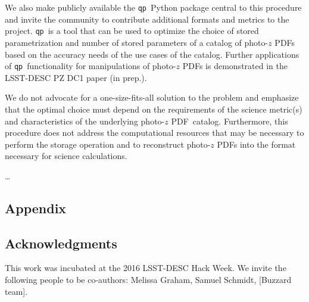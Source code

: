 \documentclass[\docopts]{\docclass}
\newcommand{\qp}{\texttt{qp}}
\newcommand{\pz}{photo-$z$ PDF}
\begin{document}
We also make publicly available the \qp\ Python package central to this 
procedure and invite the community to contribute additional formats and metrics 
to the project.  \qp\ is a tool that can be used to optimize the choice of 
stored parametrization and number of stored parameters of a catalog of \pz s 
based on the accuracy needs of the use cases of the catalog.  Further 
applications of \qp\ functionality for manipulations of \pz s is demonstrated 
in the LSST-DESC PZ DC1 paper (in prep.).

We do not advocate for a one-size-fits-all solution to the problem and 
emphasize that the optimal choice must depend on the requirements of the 
science metric(s) and characteristics of the underlying \pz\ catalog.  
Furthermore, this procedure does not address the computational resources that 
may be necessary to perform the storage operation and to reconstruct \pz s into 
the format necessary for science calculations.

\dots


\subsection*{Appendix}
\label{sec:kld}


\subsection*{Acknowledgments}


This work was incubated at the 2016 LSST-DESC Hack Week.  We invite the 
following people to be co-authors: Melissa Graham, Samuel Schmidt, [Buzzard 
team].  







\end{document}
